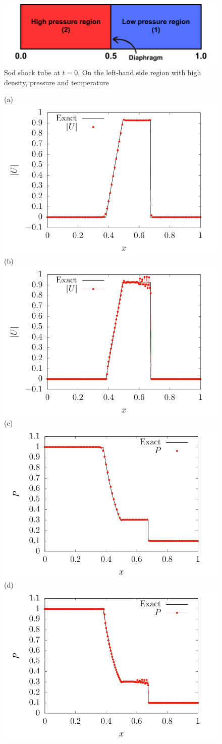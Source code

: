 \documentclass[a5paper]{sapthesis}
\begin{document}
	\begin{figure}[h]
		\centering
		\includegraphics[width=0.8 \linewidth]{Figures/SOD_TUBE_GEOMETRY}
		\caption{Sod shock tube at $t = 0$. On the left-hand side region with high density, pressure and temperature}
		\label{Sod_geometry}
	\end{figure} 
	
	\begin{figure}
		\centering
		(a)\includegraphics[width=0.45\linewidth]{Figures/Sod_umag_ref}
		(b)\includegraphics[width=0.45\linewidth]{Figures/Sod_umag_rcf}\\
		(c)\includegraphics[width=0.45\linewidth]{Figures/Sod_p_ref}
		(d)\includegraphics[width=0.45\linewidth]{Figures/Sod_p_rcf}\\

\end{figure}
\end{document}
